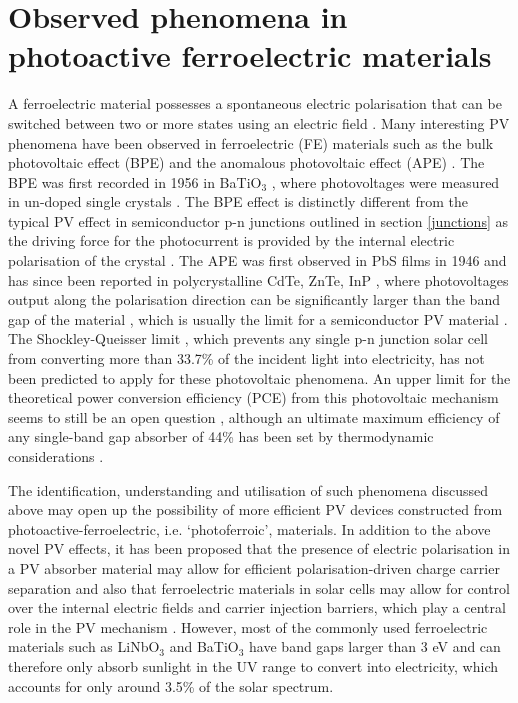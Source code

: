 \documentclass[11pt, twoside]{report}
\begin{document}
\section{Observed phenomena in photoactive ferroelectric materials}\label{ferroPVsection}
A ferroelectric material possesses a spontaneous electric polarisation that can be switched between two or more states using an electric field \cite{new_FE_PV_1}. Many interesting PV phenomena have been observed in ferroelectric (FE) materials such as the bulk photovoltaic effect (BPE) and the anomalous photovoltaic effect (APE) \cite{keith}. 
The BPE was first recorded in 1956 in BaTiO$_3$ \cite{keith_46}, where photovoltages were measured in un-doped single crystals \cite{keith}.
The BPE effect is distinctly different from the typical PV effect in semiconductor
p-n junctions outlined in section \ref{junctions} as the driving force for the photocurrent is provided by the internal electric polarisation of the crystal \cite{FE_PV_rev1}. 
The APE was first observed in PbS films in 1946 \cite{keith_54} and has since been reported in polycrystalline CdTe, ZnTe, InP \cite{keith_55, keith_56, keith_57}, where photovoltages output along the polarisation direction can be significantly larger than the band gap of the material \cite{FE_PV_rev1}, which is usually the limit for a semiconductor PV material \cite{keith}. 
The Shockley-Queisser limit \cite{SQ_1961}, which prevents any single p-n junction solar cell from converting more than 33.7\% of the incident light into electricity, has not been predicted to apply for these photovoltaic phenomena. An upper limit for the theoretical power conversion efficiency (PCE) from this photovoltaic mechanism seems to still be an open question \cite{ FE-PV_kirchartz, new_FE_PV}, although an ultimate maximum efficiency of any single-band gap absorber of 44\% has been set by thermodynamic considerations \cite{SQ_1961}. 

The identification, understanding and utilisation of such phenomena discussed above may open up the possibility of more efficient PV devices constructed from photoactive-ferroelectric, i.e. `photoferroic', materials.
In addition to the above novel PV effects, it has been proposed that the presence of electric polarisation in a PV absorber material may allow for efficient polarisation-driven charge carrier separation \cite{Jarv, FE-PV_lett} and also that ferroelectric materials in solar cells may allow for control over the internal electric fields and carrier injection barriers, which play a central role in the PV mechanism \cite{FE-PV_kirchartz}.
However, most of the commonly used ferroelectric materials such as LiNbO$_3$ and BaTiO$_3$ have band gaps larger than 3 eV and can therefore only absorb sunlight in the UV range to convert into electricity, which accounts for only around 3.5\% of the solar spectrum. 
\end{document}
